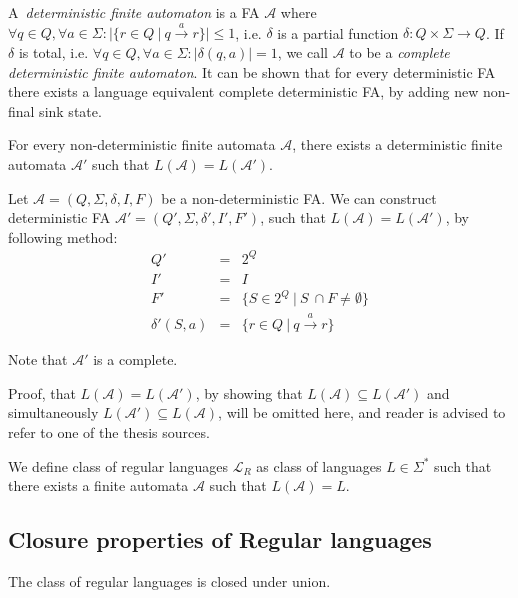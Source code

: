 	A~\emph{deterministic finite automaton} is a FA $\mathcal{A}$ where $\forall q \in Q, \forall a \in \Sigma: |\{ r \in Q\ |\ q \overset{a}{\longrightarrow} r\}| \leq 1$, i.e. $\delta$ is a partial function $\delta : Q \times \Sigma \longrightarrow Q$. If $\delta$ is total, i.e. $\forall q \in Q, \forall a \in \Sigma : |\delta(q, a)| = 1$, we call $\mathcal{A}$ to be a \emph{complete deterministic finite automaton}. It can be shown that for every deterministic FA there exists a language equivalent complete deterministic FA, by adding new non-final sink state.
	
	\begin{lemma}
	 For every non-deterministic finite automata $\mathcal{A}$, there exists a deterministic finite automata $\mathcal{A}'$ such that $L(\mathcal{A}) = L(\mathcal{A}')$.
	\end{lemma}
	
	Let $\mathcal{A} = (Q, \Sigma, \delta, I, F)$ be a non-deterministic FA. We can construct deterministic FA $\mathcal{A}'= (Q', \Sigma, \delta', I', F')$, such that $L(\mathcal{A}) = L(\mathcal{A}')$, by following method:
	\begin{eqnarray*}
	 Q' & = & 2^Q\\
	 I' & = & I\\
	 F' & = & \{S \in 2^Q\ |\ S~\cap F \neq \emptyset\}\\
	 \delta'(S, a) & = & \{r \in Q\ |\ q \overset{a}{\longrightarrow} r\}
	\end{eqnarray*}
	
	Note that $\mathcal{A}'$ is a complete.
	
	Proof, that $L(\mathcal{A}) = L(\mathcal{A}')$, by showing that $L(\mathcal{A}) \subseteq L(\mathcal{A}')$ and simultaneously $L(\mathcal{A}') \subseteq L(\mathcal{A})$, will be omitted here, and reader is advised to refer to one of the thesis sources.
	
	\begin{defz}
	 We define class of regular languages $\mathcal{L}_R$ as class of languages $L \in \Sigma^*$ such that there exists a finite automata $\mathcal{A}$ such that $L(\mathcal{A}) = L$.
	\end{defz}
	
 \subsection{Closure properties of Regular languages}

\begin{theorem}
 The class of regular languages is closed under union.
\end{theorem}

